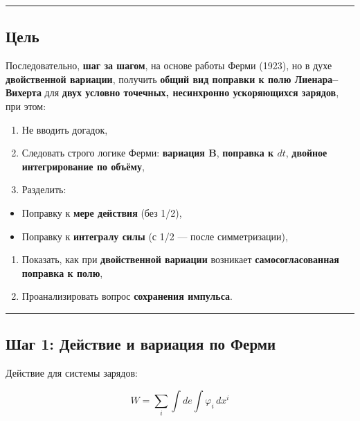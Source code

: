 \documentclass[11pt]{article}
\providecommand{\tightlist}{%
      \setlength{\itemsep}{0pt}\setlength{\parskip}{0pt}}
\begin{document}
\begin{center}\rule{0.5\linewidth}{\linethickness}\end{center}

\subsection{ Цель}

Последовательно, \textbf{шаг за шагом}, на основе работы Ферми (1923),
но в духе \textbf{двойственной вариации}, получить \textbf{общий вид
поправки к полю Лиенара--Вихерта} для \textbf{двух условно точечных,
несинхронно ускоряющихся зарядов}, при этом:

\begin{enumerate}
\def\labelenumi{\arabic{enumi}.}
\tightlist
\item
  Не вводить догадок,
\item
  Следовать строго логике Ферми: \textbf{вариация B}, \textbf{поправка к
  \(dt\)}, \textbf{двойное интегрирование по объёму},
\item
  Разделить:
\end{enumerate}

\begin{itemize}
\tightlist
\item
  Поправку к \textbf{мере действия} (без 1/2),
\item
  Поправку к \textbf{интегралу силы} (с 1/2 --- после симметризации),
\end{itemize}

\begin{enumerate}
\def\labelenumi{\arabic{enumi}.}
\setcounter{enumi}{3}
\tightlist
\item
  Показать, как при \textbf{двойственной вариации} возникает
  \textbf{самосогласованная поправка к полю},
\item
  Проанализировать вопрос \textbf{сохранения импульса}.
\end{enumerate}

\begin{center}\rule{0.5\linewidth}{\linethickness}\end{center}

\subsection{ Шаг 1: Действие и вариация по Ферми}

Действие для системы зарядов:

\[
W = \sum_i \int de \int \varphi_i \, dx^i
\]
\end{document}
